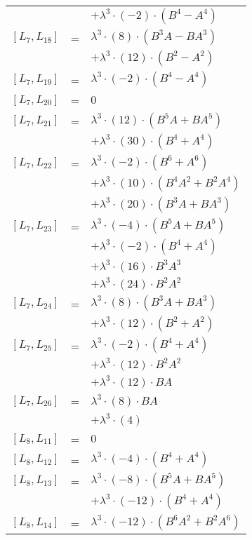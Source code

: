 \documentclass{article}
\begin{document}
\begin{center}
\begin{longtable}{lll}
 & & $ + {\lambda}^3{\cdot}(-2){\cdot}(B^{4}-A^{4})$ \\
$[L_{7},L_{18}]$ & = & ${\lambda}^3{\cdot}(8){\cdot}(B^{3}A-BA^{3})$ \\*
 & & $ + {\lambda}^3{\cdot}(12){\cdot}(B^{2}-A^{2})$ \\
$[L_{7},L_{19}]$ & = & ${\lambda}^3{\cdot}(-2){\cdot}(B^{4}-A^{4})$ \\
$[L_{7},L_{20}]$ & = & $ 0 $ \\
$[L_{7},L_{21}]$ & = & ${\lambda}^3{\cdot}(12){\cdot}(B^{5}A+BA^{5})$ \\*
 & & $ + {\lambda}^3{\cdot}(30){\cdot}(B^{4}+A^{4})$ \\
$[L_{7},L_{22}]$ & = & ${\lambda}^3{\cdot}(-2){\cdot}(B^{6}+A^{6})$ \\*
 & & $ + {\lambda}^3{\cdot}(10){\cdot}(B^{4}A^{2}+B^{2}A^{4})$ \\*
 & & $ + {\lambda}^3{\cdot}(20){\cdot}(B^{3}A+BA^{3})$ \\
$[L_{7},L_{23}]$ & = & ${\lambda}^3{\cdot}(-4){\cdot}(B^{5}A+BA^{5})$ \\*
 & & $ + {\lambda}^3{\cdot}(-2){\cdot}(B^{4}+A^{4})$ \\*
 & & $ + {\lambda}^3{\cdot}(16){\cdot}B^{3}A^{3}$ \\*
 & & $ + {\lambda}^3{\cdot}(24){\cdot}B^{2}A^{2}$ \\
$[L_{7},L_{24}]$ & = & ${\lambda}^3{\cdot}(8){\cdot}(B^{3}A+BA^{3})$ \\*
 & & $ + {\lambda}^3{\cdot}(12){\cdot}(B^{2}+A^{2})$ \\
$[L_{7},L_{25}]$ & = & ${\lambda}^3{\cdot}(-2){\cdot}(B^{4}+A^{4})$ \\*
 & & $ + {\lambda}^3{\cdot}(12){\cdot}B^{2}A^{2}$ \\*
 & & $ + {\lambda}^3{\cdot}(12){\cdot}BA$ \\
$[L_{7},L_{26}]$ & = & ${\lambda}^3{\cdot}(8){\cdot}BA$ \\*
 & & $ + {\lambda}^3{\cdot}(4)$ \\
$[L_{8},L_{11}]$ & = & $ 0 $ \\
$[L_{8},L_{12}]$ & = & ${\lambda}^3{\cdot}(-4){\cdot}(B^{4}+A^{4})$ \\
$[L_{8},L_{13}]$ & = & ${\lambda}^3{\cdot}(-8){\cdot}(B^{5}A+BA^{5})$ \\*
 & & $ + {\lambda}^3{\cdot}(-12){\cdot}(B^{4}+A^{4})$ \\
$[L_{8},L_{14}]$ & = & ${\lambda}^3{\cdot}(-12){\cdot}(B^{6}A^{2}+B^{2}A^{6})$ \\*

\end{longtable}
\end{center}
\end{document}
